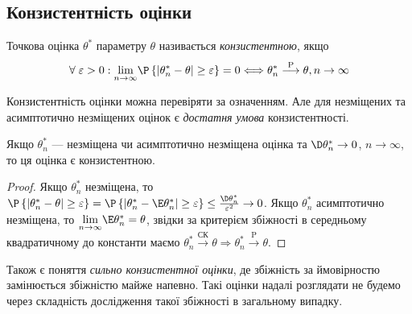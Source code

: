 \subsection{Конзистентність оцінки}
\begin{definition}
    Точкова оцінка $\theta^*$ параметру $\theta$ називається \emph{конзистентною}, якщо
    \begin{gather}\label{estim_consis}
        \forall \; \varepsilon > 0: \underset{n \to \infty}{\lim} \P\left\{|\theta^*_n - \theta| \geq \varepsilon\right\}= 0
        \Longleftrightarrow \theta^*_n \overset{\mathrm{P}}{\longrightarrow} \theta, n \to \infty
    \end{gather}
\end{definition}
Конзистентність оцінки можна перевіряти за означенням. Але для незміщених та асимптотично незміщених оцінок є
\emph{достатня умова} конзистентності.
\begin{proposition*}
    Якщо $\theta^*_n$ --- незміщена чи асимптотично незміщена оцінка та $\D\theta^*_n \to 0$, $n \to \infty$,
    то ця оцінка є конзистентною.
\end{proposition*}
\begin{proof}
    Якщо $\theta^*_n$ незміщена, то 
    $\P\left\{|\theta^*_n - \theta| \geq \varepsilon\right\}=\P\left\{|\theta^*_n - \E\theta^*_n| \geq \varepsilon\right\} 
    \leq \frac{\D\theta^*_n}{\varepsilon^2} \to 0$.
    Якщо $\theta^*_n$ асимптотично незміщена, то $\underset{n\to\infty}{\lim} \E\theta^*_n = \theta$,
    звідки за критерієм збіжності в середньому квадратичному до константи маємо 
    $\theta^*_n \overset{\text{СК}}{\longrightarrow} \theta \Rightarrow \theta^*_n \overset{\mathrm{P}}{\longrightarrow} \theta$.
\end{proof}
\begin{remark}
    Також є поняття \emph{сильно конзистентної оцінки}, де збіжність за ймовірностю замінюється збіжністю майже напевно.
    Такі оцінки надалі розглядати не будемо через складність дослідження такої збіжності в загальному випадку. 
\end{remark}
